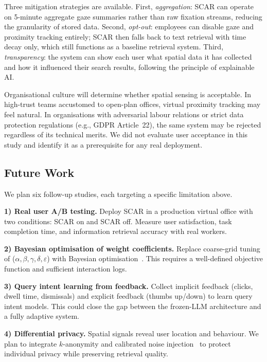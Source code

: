 \documentclass[journal]{IEEEtran}
\begin{document}
Three mitigation strategies are available. First, \emph{aggregation}: SCAR can operate on 5-minute aggregate gaze summaries rather than raw fixation streams, reducing the granularity of stored data. Second, \emph{opt-out}: employees can disable gaze and proximity tracking entirely; SCAR then falls back to text retrieval with time decay only, which still functions as a baseline retrieval system. Third, \emph{transparency}: the system can show each user what spatial data it has collected and how it influenced their search results, following the principle of explainable AI.

Organisational culture will determine whether spatial sensing is acceptable. In high-trust teams accustomed to open-plan offices, virtual proximity tracking may feel natural. In organisations with adversarial labour relations or strict data protection regulations (e.g., GDPR Article~22), the same system may be rejected regardless of its technical merits. We did not evaluate user acceptance in this study and identify it as a prerequisite for any real deployment.

\subsection{Future Work}
\label{subsec:future_work}

We plan six follow-up studies, each targeting a specific limitation above.

\textbf{1) Real user A/B testing.}
Deploy SCAR in a production virtual office with two conditions: SCAR on and SCAR off.
Measure user satisfaction, task completion time, and information retrieval accuracy with real workers.

\textbf{2) Bayesian optimisation of weight coefficients.}
Replace coarse-grid tuning of ($\alpha, \beta, \gamma, \delta, \varepsilon$) with Bayesian optimisation~\cite{bayesopt}.
This requires a well-defined objective function and sufficient interaction logs.

\textbf{3) Query intent learning from feedback.}
Collect implicit feedback (clicks, dwell time, dismissals) and explicit feedback (thumbs up/down) to learn query intent models.
This could close the gap between the frozen-LLM architecture and a fully adaptive system.

\textbf{4) Differential privacy.}
Spatial signals reveal user location and behaviour.
We plan to integrate $k$-anonymity and calibrated noise injection~\cite{diffprivacy} to protect individual privacy while preserving retrieval quality.
\end{document}
